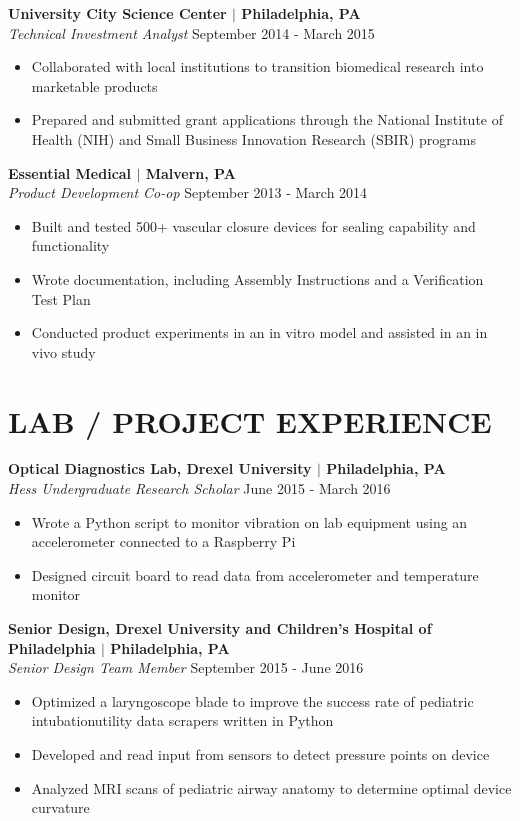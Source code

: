 \documentclass[line,resmargin]{res}
\begin{document}
\begin{resume}
\textbf{University City Science Center $|$ Philadelphia, PA} \\
{\sl Technical Investment Analyst} \hfill September 2014 - March 2015 
	\begin{itemize} \itemsep -2pt
		\item Collaborated with local institutions to transition biomedical research into marketable products
		\item Prepared and submitted grant applications through the National Institute of Health (NIH) and Small Business Innovation Research (SBIR) programs
	\end{itemize}
				
\textbf{Essential Medical $|$ Malvern, PA} \\
{\sl Product Development Co-op} \hfill September 2013 - March 2014
	\begin{itemize} \itemsep -2pt
		\item  Built and tested 500+ vascular closure devices for sealing capability and functionality
		\item  Wrote documentation, including Assembly Instructions and a Verification Test Plan
		\item  Conducted product experiments in an in vitro model and assisted in an in vivo study
	\end{itemize}

\section{LAB / PROJECT EXPERIENCE}
\textbf{Optical Diagnostics Lab, Drexel University $|$ Philadelphia, PA} \\
{\sl Hess Undergraduate Research Scholar} \hfill June 2015 - March 2016
	\begin{itemize}  \itemsep -2pt
		\item  Wrote a Python script to monitor vibration on lab equipment using an accelerometer connected to a Raspberry Pi
		\item  Designed circuit board to read data from accelerometer and temperature monitor
	\end{itemize}

\textbf{Senior Design, Drexel University and Children's Hospital of Philadelphia $|$ Philadelphia, PA} \\
{\sl Senior Design Team Member} \hfill September 2015 - June 2016 \\
\begin{itemize} \itemsep -2pt
	\item  Optimized a laryngoscope blade to improve the success rate of pediatric intubationutility data scrapers written in Python
	\item  Developed and read input from sensors to detect pressure points on device
	\item  Analyzed MRI scans of pediatric airway anatomy to determine optimal device curvature
\end{itemize}


\end{resume}
\end{document}
